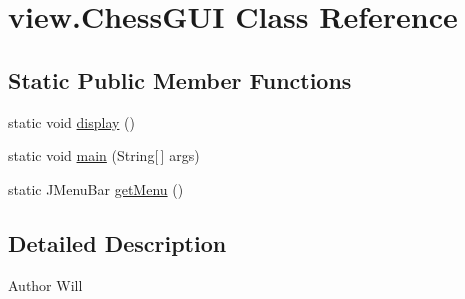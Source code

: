 \hypertarget{classview_1_1_chess_g_u_i}{\section{view.\-Chess\-G\-U\-I Class Reference}
\label{classview_1_1_chess_g_u_i}
}
\subsection*{Static Public Member Functions}
\begin{DoxyCompactItemize}
\item 
static void \hyperlink{classview_1_1_chess_g_u_i_ac5b58299ff497923aad2d29e68134c65}{display} ()
\item 
static void \hyperlink{classview_1_1_chess_g_u_i_a6b5bff5d24230dd679cc36b255920073}{main} (String\mbox{[}$\,$\mbox{]} args)
\item 
static J\-Menu\-Bar \hyperlink{classview_1_1_chess_g_u_i_aafcdfb97a6e50194632102d206cb8828}{get\-Menu} ()
\end{DoxyCompactItemize}


\subsection{Detailed Description}
\begin{DoxyAuthor}{Author}
Will 
\end{DoxyAuthor}


